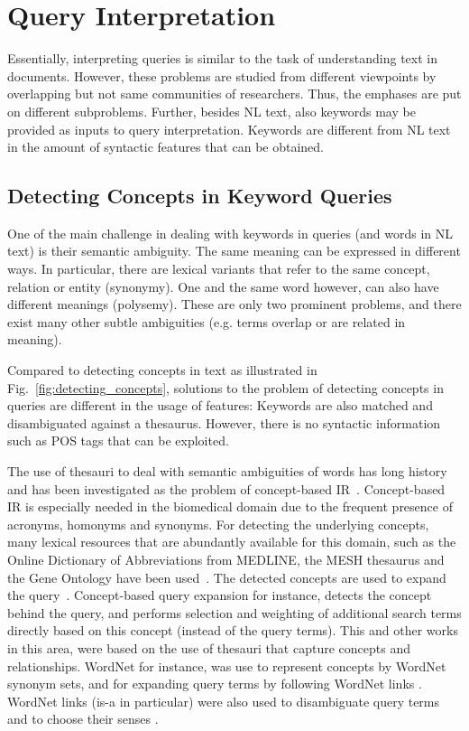 \section{Query Interpretation}\label{sec:query} 
	Essentially, interpreting queries is similar to the task of understanding text in documents. However, these problems are studied from different viewpoints by overlapping but not same communities of researchers. Thus, the emphases are put on different subproblems. Further, besides NL text, also keywords may be provided as inputs to query interpretation. Keywords are different from NL text in the amount of syntactic features that can be obtained. 
	
\subsection{Detecting Concepts in Keyword Queries} One of the main challenge in dealing with keywords in queries (and words in NL text) is their semantic ambiguity. The same meaning can be expressed in different ways. In particular, there are lexical variants that refer to the same concept, relation or entity (synonymy). One and the same word however, can also have different meanings (polysemy). These are only two prominent problems, and there exist many other subtle ambiguities (e.g. terms overlap or are related in meaning). 

Compared to detecting concepts in text as illustrated in Fig.~\ref{fig:detecting_concepts}, solutions to the problem of detecting concepts in queries are different in the usage of features: Keywords are also matched and disambiguated against a thesaurus. However, there is no syntactic information such as POS tags that can be exploited. 

The use of thesauri to deal with semantic ambiguities of words has long history and has been investigated as the problem of concept-based IR~\cite{DBLP:conf/sigir/Giger88}. Concept-based IR is especially needed in the biomedical domain due to the frequent presence of acronyms, homonyms and synonyms. For detecting the underlying concepts, many lexical resources that are abundantly available for this domain, such as the Online Dictionary of Abbreviations from MEDLINE, the MESH thesaurus and the Gene Ontology have been used~\cite{DBLP:conf/sigir/ZhongH06,DBLP:conf/trec/JelierSEWMSMK03}. The detected concepts are used to expand the query~\cite{DBLP:conf/sigir/QiuF93,DBLP:conf/trec/JelierSEWMSMK03}. Concept-based query expansion \cite{DBLP:conf/sigir/QiuF93} for instance, detects the concept behind the query, and performs selection and weighting of additional search terms directly based on this concept (instead of the query terms). This and other works in this area, were based on the use of thesauri that capture concepts and relationships. WordNet for instance, was use to represent concepts by WordNet synonym sets, and for expanding query terms by following WordNet links \cite{DBLP:conf/sigir/Voorhees93}. WordNet links (is-a in particular) were also used to disambiguate query terms and to choose their senses \cite{DBLP:conf/sigir/Voorhees94}. 


